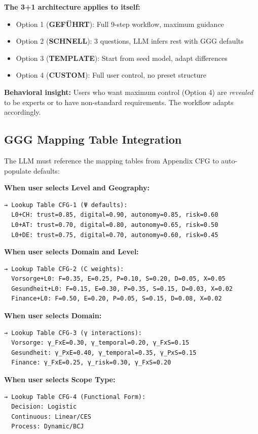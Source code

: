 \begin{tcolorbox}[colback=cyan!5!white, colframe=cyan!75!black,
    title=Step 0: Recursive 3+1 for Workflow Selection]
\textbf{The 3+1 architecture applies to itself:}
\begin{itemize}[nosep]
\item Option 1 (\textbf{GEFÜHRT}): Full 9-step workflow, maximum guidance
\item Option 2 (\textbf{SCHNELL}): 3 questions, LLM infers rest with GGG defaults
\item Option 3 (\textbf{TEMPLATE}): Start from seed model, adapt differences
\item Option 4 (\textbf{CUSTOM}): Full user control, no preset structure
\end{itemize}

\textbf{Behavioral insight:} Users who want maximum control (Option 4) are
\textit{revealed} to be experts or to have non-standard requirements. The
workflow adapts accordingly.
\end{tcolorbox}

\subsection{GGG Mapping Table Integration}

The LLM must reference the mapping tables from Appendix CFG to auto-populate defaults:

\begin{tcolorbox}[colback=white, colframe=black,
    title=GGG Mapping Reference for LLM]
\small
\textbf{When user selects Level and Geography:}
\begin{verbatim}
→ Lookup Table CFG-1 (Ψ defaults):
  L0+CH: trust=0.85, digital=0.90, autonomy=0.85, risk=0.60
  L0+AT: trust=0.70, digital=0.80, autonomy=0.65, risk=0.50
  L0+DE: trust=0.75, digital=0.70, autonomy=0.60, risk=0.45
\end{verbatim}

\textbf{When user selects Domain and Level:}
\begin{verbatim}
→ Lookup Table CFG-2 (C weights):
  Vorsorge+L0: F=0.35, E=0.25, P=0.10, S=0.20, D=0.05, X=0.05
  Gesundheit+L0: F=0.15, E=0.30, P=0.35, S=0.15, D=0.03, X=0.02
  Finance+L0: F=0.50, E=0.20, P=0.05, S=0.15, D=0.08, X=0.02
\end{verbatim}

\textbf{When user selects Domain:}
\begin{verbatim}
→ Lookup Table CFG-3 (γ interactions):
  Vorsorge: γ_FxE=0.30, γ_temporal=0.20, γ_FxS=0.15
  Gesundheit: γ_PxE=0.40, γ_temporal=0.35, γ_PxS=0.15
  Finance: γ_FxE=0.25, γ_risk=0.30, γ_FxS=0.20
\end{verbatim}

\textbf{When user selects Scope Type:}
\begin{verbatim}
→ Lookup Table CFG-4 (Functional Form):
  Decision: Logistic
  Continuous: Linear/CES
  Process: Dynamic/BCJ
\end{verbatim}
\end{tcolorbox}

